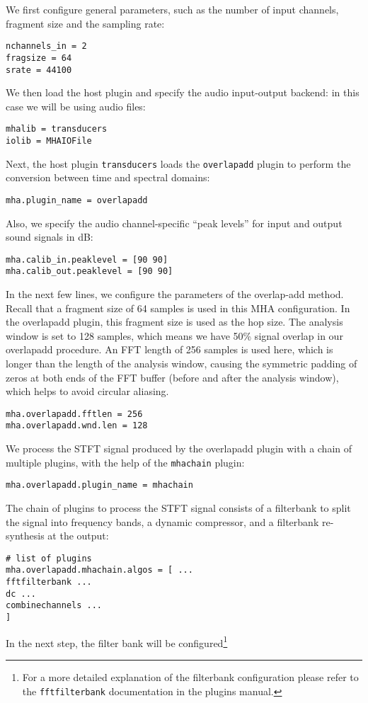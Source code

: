 We first configure general parameters, such as the number of input 
channels, fragment size and the sampling rate:
\begin{verbatim}
nchannels_in = 2
fragsize = 64
srate = 44100
\end{verbatim}
%
We then load the host plugin and specify the audio input-output backend:
in this case we will be using audio files:
\begin{verbatim}
mhalib = transducers
iolib = MHAIOFile
\end{verbatim}
%
Next, the host plugin \verb!transducers! loads the \verb!overlapadd! plugin 
to perform the conversion between time and spectral domains:
\begin{verbatim}
mha.plugin_name = overlapadd
\end{verbatim}
%
Also, we specify the audio channel-specific ``peak levels'' for input and output sound 
signals in dB:
\begin{verbatim}
mha.calib_in.peaklevel = [90 90]
mha.calib_out.peaklevel = [90 90]
\end{verbatim}
In the next few lines, we configure the parameters of the overlap-add
method.
%
Recall that a fragment size of 64 samples is used in this MHA configuration.
%
In the overlapadd plugin, this fragment size is used as the hop size.
%
The analysis window is set to 128 \label{overlapexplanation} samples,
which means we have 50\% signal overlap in our overlapadd procedure.
%
An FFT length of 256 samples is used here, which is longer than the
length of the analysis window, causing the symmetric padding of zeros
at both ends of the FFT buffer (before and after the analysis window),
which helps to avoid circular aliasing.
\begin{verbatim}
mha.overlapadd.fftlen = 256
mha.overlapadd.wnd.len = 128
\end{verbatim}
%
We process the STFT signal produced by the overlapadd plugin with a
chain of multiple plugins, with the help of the \verb!mhachain!
plugin:
\begin{verbatim}
mha.overlapadd.plugin_name = mhachain
\end{verbatim}
%
The chain of plugins to process the STFT signal consists of a
filterbank to split the signal into frequency bands, a dynamic
compressor, and a filterbank re-synthesis at the output:
\begin{verbatim}
# list of plugins
mha.overlapadd.mhachain.algos = [ ... 
fftfilterbank ... 
dc ... 
combinechannels ...
]
\end{verbatim}
In the next step, the filter bank will be configured\footnote{
  For a more detailed explanation of the filterbank
  configuration please refer to the \texttt{fftfilterbank}
  documentation in the \mha{} plugins manual.
}
